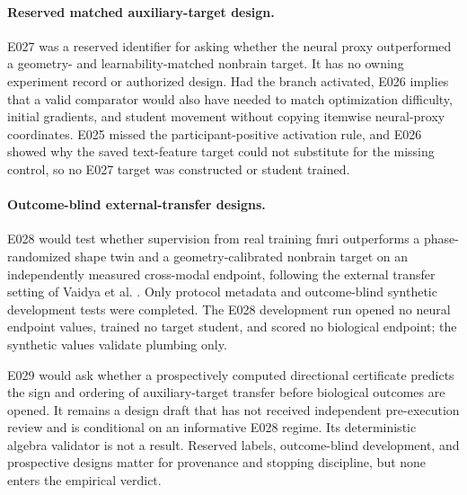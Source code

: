 \paragraph{Reserved matched auxiliary-target design.}
E027 was a reserved identifier for asking whether the neural proxy outperformed a geometry- and learnability-matched nonbrain target.
It has no owning experiment record or authorized design.
Had the branch activated, E026 implies that a valid comparator would also have needed to match optimization difficulty, initial gradients, and student movement without copying itemwise neural-proxy coordinates.
E025 missed the participant-positive activation rule, and E026 showed why the saved text-feature target could not substitute for the missing control, so no E027 target was constructed or student trained. 

\paragraph{Outcome-blind external-transfer designs.}
E028 would test whether supervision from real training \ac{fmri} outperforms a phase-randomized shape twin and a geometry-calibrated nonbrain target on an independently measured cross-modal endpoint, following the external transfer setting of Vaidya et al. \autocite{vaidya2026}.
Only protocol metadata and outcome-blind synthetic development tests were completed.
The E028 development run opened no neural endpoint values, trained no target student, and scored no biological endpoint; the synthetic values validate plumbing only. 

E029 would ask whether a prospectively computed directional certificate predicts the sign and ordering of auxiliary-target transfer before biological outcomes are opened.
It remains a design draft that has not received independent pre-execution review and is conditional on an informative E028 regime.
Its deterministic algebra validator is not a result. 
Reserved labels, outcome-blind development, and prospective designs matter for provenance and stopping discipline, but none enters the empirical verdict.
